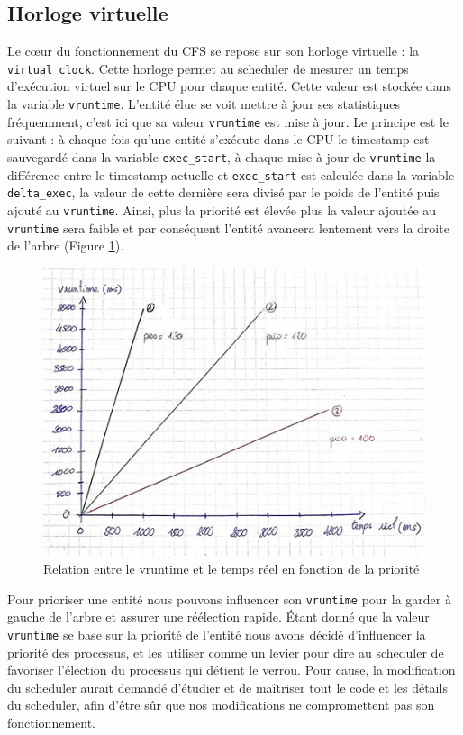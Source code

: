 \subsection{Horloge virtuelle}
Le cœur du fonctionnement du CFS se repose sur son horloge virtuelle : la
\verb|virtual clock|. Cette horloge permet au scheduler de mesurer un temps
d'exécution virtuel sur le CPU pour chaque entité. Cette valeur est stockée dans
la variable \verb|vruntime|. L'entité élue se voit mettre à jour ses statistiques
fréquemment, c'est ici que sa valeur \verb|vruntime| est mise à jour. Le
principe est le suivant : à chaque fois qu'une entité s'exécute dans le CPU le
timestamp est sauvegardé dans la variable \verb|exec_start|, à chaque mise à
jour de \verb|vruntime| la différence entre le timestamp actuelle et
\verb|exec_start| est calculée dans la variable \verb|delta_exec|, la valeur de
cette dernière sera divisé par le poids de l'entité puis ajouté au
\verb|vruntime|. Ainsi, plus la priorité est élevée plus la valeur ajoutée au
\verb|vruntime| sera faible et par conséquent l'entité avancera lentement vers
la droite de l'arbre (Figure \ref{fig:sched}).
\begin{figure}[h!]
	\centering
	\includegraphics[scale=2.5]{include/schema_sched.jpg}
	\caption{Relation entre le vruntime et le temps réel en fonction de la priorité}
	\label{fig:sched}
\end{figure}

Pour prioriser une entité nous pouvons influencer son 
\verb|vruntime| pour la garder à gauche de l'arbre et assurer une réélection 
rapide. Étant donné que la valeur \verb|vruntime| se base sur la priorité de 
l'entité nous avons décidé d'influencer la priorité des processus, et 
les utiliser comme un levier pour dire au scheduler de favoriser l'élection 
du processus qui détient le verrou. Pour cause, la modification du scheduler aurait
demandé d'étudier et de maîtriser tout le code et les détails du scheduler, afin
d'être sûr que nos modifications ne compromettent pas son fonctionnement.